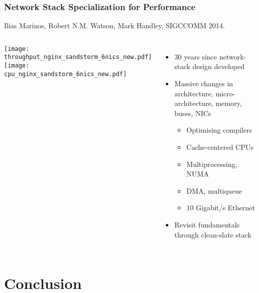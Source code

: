 \begin{frame}
  \frametitle{Network Stack Specialization for Performance}

  Ilias Marinos, Robert N.M. Watson, Mark Handley, SIGCCOMM 2014.

  \smallskip

  \begin{columns}[T]

    \smallskip
    \texttt{[image: throughput\_nginx\_sandstorm\_6nics\_new.pdf]} \\
    \texttt{[image: cpu\_nginx\_sandstorm\_6nics\_new.pdf]}


    \pause

    \begin{itemize}
      \item 30 years since network-stack design developed

      \medskip
      \pause

      \item Massive changes in architecture, micro-architecture, memory,
	buses, NICs
      \begin{itemize}
	\item Optimising compilers
	\item Cache-centered CPUs
	\item Multiprocessing, NUMA
	\item DMA, multiqueue
	\item 10 Gigabit/s Ethernet
      \end{itemize}

      \medskip
      \pause

      \item Revisit fundamentals through clean-slate stack
    \end{itemize}
  \end{columns}
\end{frame}

\section{Conclusion}

